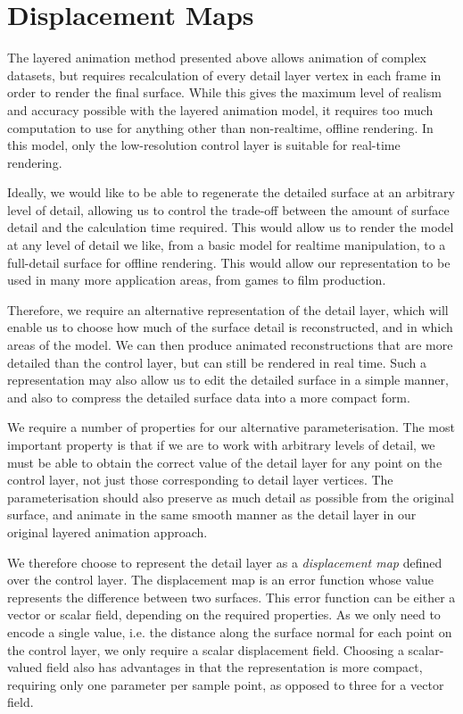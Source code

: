 \chapter{\label{sec:dispmapcreation} Displacement Maps}

The layered animation method presented above allows animation of complex datasets, but requires recalculation of every detail layer vertex in each frame in order to render the final surface. While this gives the maximum level of realism and accuracy possible with the layered animation model, it requires too much computation to use for anything other than non-realtime, offline rendering. In this model, only the low-resolution control layer is suitable for real-time rendering. 

Ideally, we would like to be able to regenerate the detailed surface at an arbitrary level of detail, allowing us to control the trade-off between the amount of surface detail and the calculation time required. This would allow us to render the model at any level of detail we like, from a basic model for realtime manipulation, to a full-detail surface for offline rendering. This would allow our representation to be used in many more application areas, from games to film production.

Therefore, we require an alternative representation of the detail layer, which will enable us to choose how much of the surface detail is reconstructed, and in which areas of the model. We can then produce animated reconstructions that are more detailed than the control layer, but can still be rendered in real time. Such a representation may also allow us to edit the detailed surface in a simple manner, and also to compress the detailed surface data into a more compact form.

We require a number of properties for our alternative parameterisation. The most important property is that if we are to work with arbitrary levels of detail, we must be able to obtain the correct value of the detail layer for any point on the control layer, not just those corresponding to detail layer vertices. The parameterisation should also preserve as much detail as possible from the original surface, and animate in the same smooth manner as the detail layer in our original layered animation approach.

We therefore choose to represent the detail layer as a {\it displacement map} defined over the control layer. The displacement map is an error function whose value represents the difference between two surfaces. This error function can be either a vector or scalar field, depending on the required properties. As we only need to encode a single value, i.e. the distance along the surface normal for each point on the control layer, we only require a scalar displacement field. Choosing a scalar-valued field also has advantages in that the representation is more compact, requiring only one parameter per sample point, as opposed to three for a vector field.

